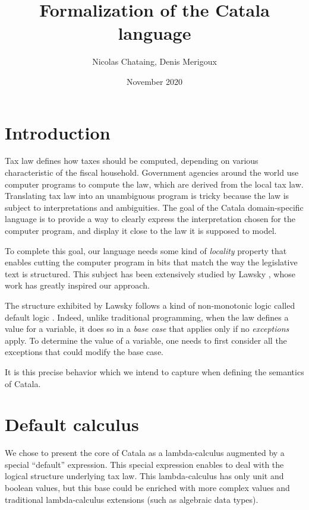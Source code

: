\documentclass[11pt,a4paper]{article}
\title{Formalization of the Catala language}
\date{November 2020}
\author{Nicolas Chataing, Denis Merigoux}
\begin{document}
\maketitle

\tableofcontents

\section{Introduction}

Tax law defines how taxes should be computed, depending on various characteristic
of the fiscal household. Government agencies around the world use computer 
programs to compute the law, which are derived from the local tax law. Translating 
tax law into an unambiguous program is tricky because the law is subject to 
interpretations and ambiguities. The goal of the Catala domain-specific language 
is to provide a way to clearly express the interpretation chosen for the 
computer program, and display it close to the law it is supposed to model.

To complete this goal, our language needs some kind of \emph{locality} property
that enables cutting the computer program in bits that match the way the 
legislative text is structured. This subject has been extensively studied by
Lawsky \cite{lawsky2017, lawsky2018, lawsky2020form}, whose work has greatly 
inspired our approach.

The structure exhibited by Lawsky follows a kind of non-monotonic logic called 
default logic \cite{Reiter1987}. Indeed, unlike traditional programming, when the law defines 
a value for a variable, it does so in a \emph{base case} that applies only if 
no \emph{exceptions} apply. To determine the value of a variable, one needs to 
first consider all the exceptions that could modify the base case. 

It is this precise behavior which we intend to capture when defining the semantics 
of Catala.

\section{Default calculus}

We chose to present the core of Catala as a lambda-calculus augmented by a special 
\enquote{default} expression. This special expression enables to deal with 
the logical structure underlying tax law. This lambda-calculus has only unit and 
boolean values, but this base could be enriched with more complex values and traditional 
lambda-calculus extensions (such as algebraic data types).
\end{document}
